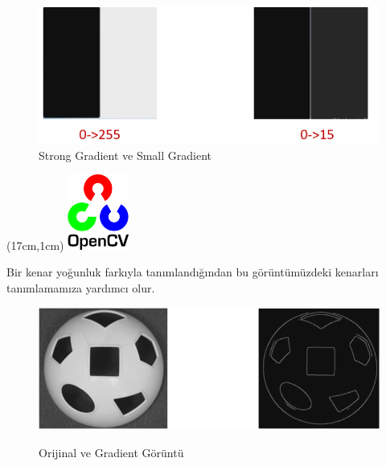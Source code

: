 \documentclass{article}
\begin{document}
\begin{figure}[h]
  \centering
  \includegraphics[width=1\textwidth]{image/Ekran Alıntısı4.PNG} %
  \caption{Strong Gradient ve Small Gradient}
  \label{fig:python16}  
\end{figure}
\newpage
\begin{textblock*}{5cm}(17cm,1cm) %
    \includegraphics[width=2cm]{image/Resim17.png} %
\end{textblock*}
\noindent Bir kenar yoğunluk farkıyla tanımlandığından bu görüntümüzdeki kenarları tanımlamamıza yardımcı olur.
\begin{figure}[h]
  \centering
  \includegraphics[width=1\textwidth]{image/Ekran Alıntısı5.PNG} %
  \caption{Orijinal ve Gradient Görüntü}\cite{mordvintsev2014opencv}
  \label{fig:python17}  
\end{figure}
\end{document}
